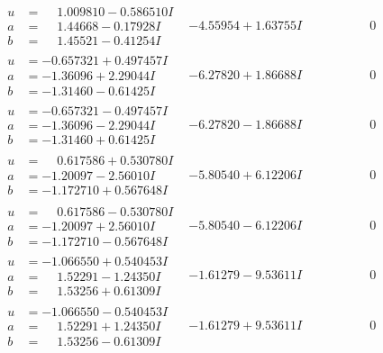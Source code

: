\documentclass[1p]{elsarticle_modified}
\theoremstyle{definition}
\begin{document}
$$\begin{array}{c|c|c}
\begin{aligned}
u &= \phantom{-}1.009810 - 0.586510 I \\
a &= \phantom{-}1.44668 - 0.17928 I \\
b &= \phantom{-}1.45521 - 0.41254 I\end{aligned}
 & -4.55954 + 1.63755 I & \phantom{-0.000000 } 0 \\ \hline\begin{aligned}
u &= -0.657321 + 0.497457 I \\
a &= -1.36096 + 2.29044 I \\
b &= -1.31460 - 0.61425 I\end{aligned}
 & -6.27820 + 1.86688 I & \phantom{-0.000000 } 0 \\ \hline\begin{aligned}
u &= -0.657321 - 0.497457 I \\
a &= -1.36096 - 2.29044 I \\
b &= -1.31460 + 0.61425 I\end{aligned}
 & -6.27820 - 1.86688 I & \phantom{-0.000000 } 0 \\ \hline\begin{aligned}
u &= \phantom{-}0.617586 + 0.530780 I \\
a &= -1.20097 - 2.56010 I \\
b &= -1.172710 + 0.567648 I\end{aligned}
 & -5.80540 + 6.12206 I & \phantom{-0.000000 } 0 \\ \hline\begin{aligned}
u &= \phantom{-}0.617586 - 0.530780 I \\
a &= -1.20097 + 2.56010 I \\
b &= -1.172710 - 0.567648 I\end{aligned}
 & -5.80540 - 6.12206 I & \phantom{-0.000000 } 0 \\ \hline\begin{aligned}
u &= -1.066550 + 0.540453 I \\
a &= \phantom{-}1.52291 - 1.24350 I \\
b &= \phantom{-}1.53256 + 0.61309 I\end{aligned}
 & -1.61279 - 9.53611 I & \phantom{-0.000000 } 0 \\ \hline\begin{aligned}
u &= -1.066550 - 0.540453 I \\
a &= \phantom{-}1.52291 + 1.24350 I \\
b &= \phantom{-}1.53256 - 0.61309 I\end{aligned}
 & -1.61279 + 9.53611 I & \phantom{-0.000000 } 0\\

\end{array}$$
\end{document}
